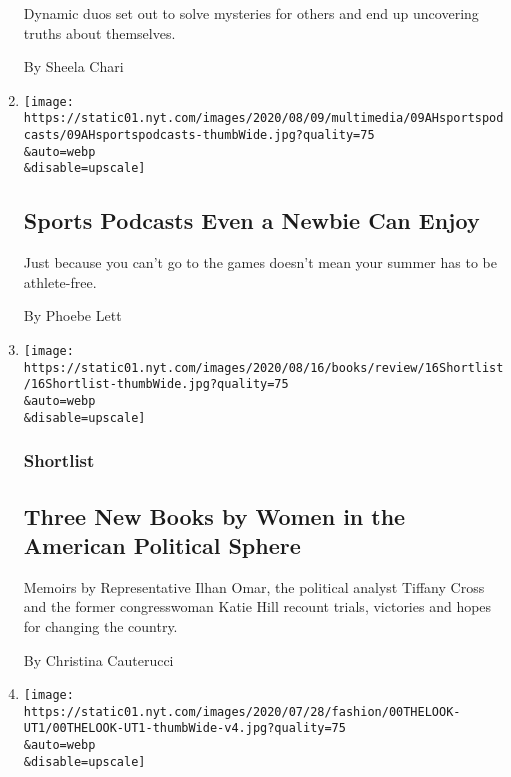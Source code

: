 \begin{enumerate}
  Dynamic duos set out to solve mysteries for others and end up
  uncovering truths about themselves.

  By Sheela Chari
\item
  \href{/2020/08/08/at-home/coronavirus-sports-podcasts.html}{}

  \texttt{[image: https://static01.nyt.com/images/2020/08/09/multimedia/09AHsportspodcasts/09AHsportspodcasts-thumbWide.jpg?quality=75\\\&auto=webp\\\&disable=upscale]}

  \hypertarget{sports-podcasts-even-a-newbie-can-enjoy}{%
  \subsection{Sports Podcasts Even a Newbie Can
  Enjoy}\label{sports-podcasts-even-a-newbie-can-enjoy}}

  Just because you can't go to the games doesn't mean your summer has to
  be athlete-free.

  By Phoebe Lett
\item
  \href{/2020/08/08/books/review/katie-hill-she-will-rise-ilhan-omar-tiffany-cross.html}{}

  \texttt{[image: https://static01.nyt.com/images/2020/08/16/books/review/16Shortlist/16Shortlist-thumbWide.jpg?quality=75\\\&auto=webp\\\&disable=upscale]}

  \hypertarget{shortlist}{%
  \subsubsection{Shortlist}\label{shortlist}}

  \hypertarget{three-new-books-by-women-in-the-american-political-sphere}{%
  \subsection{Three New Books by Women in the American Political
  Sphere}\label{three-new-books-by-women-in-the-american-political-sphere}}

  Memoirs by Representative Ilhan Omar, the political analyst Tiffany
  Cross and the former congresswoman Katie Hill recount trials,
  victories and hopes for changing the country.

  By Christina Cauterucci
\item
  \href{/2020/08/08/style/black-yearbook-university-texas-austin.html}{}

  \texttt{[image: https://static01.nyt.com/images/2020/07/28/fashion/00THELOOK-UT1/00THELOOK-UT1-thumbWide-v4.jpg?quality=75\\\&auto=webp\\\&disable=upscale]}


\end{enumerate}
